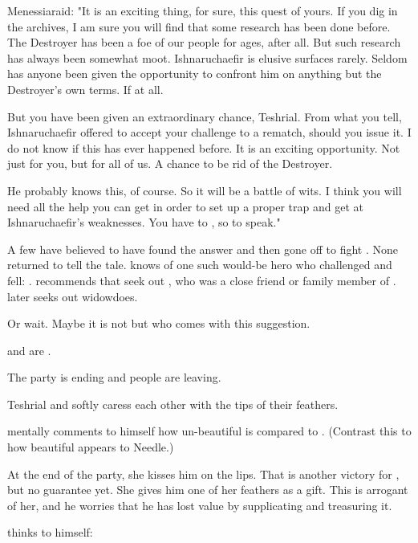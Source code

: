 Menessiaraid:
"It is an exciting thing, for sure, this quest of yours.
 If you dig in the archives, I am sure you will find that some research has been done before.
 The Destroyer has been a foe of our people for ages, after all.
 But such research has always been somewhat moot. 
 Ishnaruchaefir is elusive surfaces rarely.
 Seldom has anyone been given the opportunity to confront him on anything but the Destroyer's own terms. 
 If at all.
 
 But you have been given an extraordinary chance, Teshrial.
 From what you tell, Ishnaruchaefir offered to accept your challenge to a rematch, should you issue it.
 I do not know if this has ever happened before.
 It is an exciting opportunity.
 Not just for you, but for all of us.
 A chance to be rid of the Destroyer.
 
 He probably knows this, of course.
 So it will be a battle of wits.
 I think you will need all the help you can get in order to set up a proper trap and get at Ishnaruchaefir's weaknesses.
 You have to , so to speak."

A few have believed to have found the answer and then gone off to fight \Ishnaruchaefir{}. 
None returned to tell the tale. 
\Menessiaraid{} knows of one such would-be hero who challenged \Ishnaruchaefir{} and fell: 
{\Lothagiel}. 
\Menessiaraid{} recommends that \Teshrial{} seek out \Nemuragh, who was a close friend or family member of \Lothagiel. 
\Teshrial{} later {\Teshrial{} seeks out widow}{does}. 

Or wait. 
Maybe it is not \Menessiaraid but \Dezruth who comes with this suggestion. 

\Lothagiel and \Nemuragh are \TiphredSerah. 








\begin{comment}
\subsection{Party ends}
\end{comment}
\new
The party is ending and people are leaving. 

Teshrial and \Firaxel{} softly caress each other with the tips of their feathers. 

\Teshrial{} mentally comments to himself how un-beautiful \Achsah{} is compared to \Firaxel. 
(Contrast this to how beautiful \Achsah{} appears to Needle.) 

At the end of the party, she kisses him on the lips. 
That is another victory for \Teshrial, but no guarantee yet. 
She gives him one of her feathers as a gift. 
This is arrogant of her, and he worries that he has lost value by supplicating and treasuring it. 

\Teshrial thinks to himself: 





